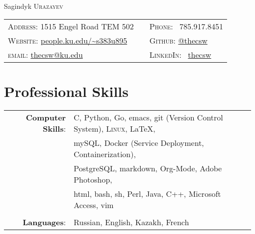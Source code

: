 \documentclass[a4paper,10pt]{article}
\begin{document}
\pagestyle{empty} %

\par{\centering
		{\Huge Sagindyk \textsc{Urazayev}
	}\bigskip\par}

      \begin{center}
        \begin{tabular}{lcl}
          \textsc{Address:}   1515 Engel Road TEM 502 &&
          \textsc{Phone:} \quad \ 785.917.8451\\

          \textsc{Website:} \href{http://people.ku.edu/~s383u895}{people.ku.edu/\textasciitilde{}s383u895}&&
          \textsc{Github:} \quad \href{https://github.com/thecsw}{@thecsw}\\
          
          \textsc{email:} \quad \href{mailto:thecsw@ku.edu}{thecsw@ku.edu} &&
          \textsc{LinkedIn:} \ \href{https://linkedin.com/in/thecsw}{thecsw}\\
        \end{tabular}
      \end{center}
      
\section{Professional Skills}
\begin{tabular}{rl}

  \textbf{Computer Skills}:& C, Python, Go, emacs, git (Version Control System), \textsc{Linux}, \LaTeX, \\& mySQL,
  Docker (Service Deployment, Containerization),\\&
  PostgreSQL, markdown, Org-Mode, Adobe Photoshop, \\& html, bash, sh, Perl, Java, C++, Microsoft Access, vim\\\\

  \textbf{Languages}: &Russian, English, Kazakh, French\\
  
\end{tabular}
\end{document}
